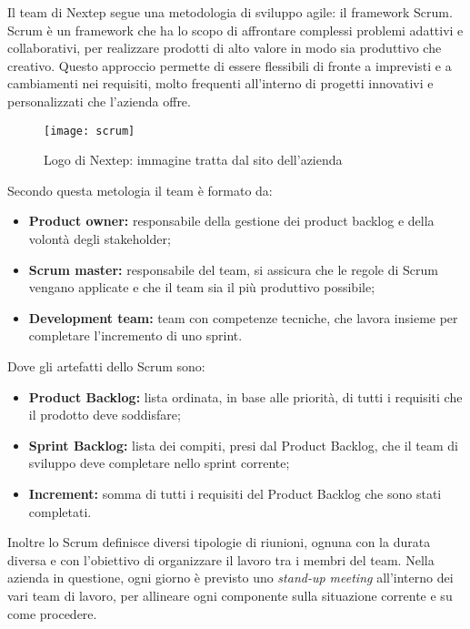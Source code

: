 Il team di Nextep segue una metodologia di sviluppo agile: il \gls{framework} Scrum.
Scrum è un framework che ha lo scopo di affrontare complessi problemi adattivi
e collaborativi, per realizzare prodotti di alto valore in modo sia produttivo che creativo.
Questo approccio permette di essere flessibili di fronte a imprevisti e a cambiamenti
nei requisiti, molto frequenti all’interno di progetti innovativi e personalizzati che
l’azienda offre.
\\
\begin{figure}[!h] 
	\centering 
	\texttt{[image: scrum]} 
	\caption{Logo di Nextep: immagine tratta dal sito dell’azienda}
\end{figure}
\newpage
Secondo questa metologia il team è formato da: 
\begin{itemize}
	\item \textbf{Product owner:} responsabile della gestione dei product backlog e della
	volontà degli stakeholder;
	\item \textbf{Scrum master:} responsabile del team, si assicura che le regole di Scrum
	vengano applicate e che il team sia il più produttivo possibile;
	\item \textbf{Development team:} team con competenze tecniche, che lavora insieme per
	completare l’incremento di uno sprint.
\end{itemize}

Dove gli artefatti dello Scrum sono: 
\begin{itemize}
	\item \textbf{Product Backlog:} lista ordinata, in base alle priorità, di tutti i requisiti che
	il prodotto deve soddisfare;
	\item \textbf{Sprint Backlog:} lista dei compiti, presi dal Product Backlog, che il team di
	sviluppo deve completare nello sprint corrente;
	\item \textbf{Increment:} somma di tutti i requisiti del Product Backlog che sono stati
	completati.
\end{itemize}

Inoltre lo Scrum definisce diversi tipologie di riunioni, ognuna con la durata diversa e con l'obiettivo di organizzare il lavoro tra i membri del team. Nella azienda in questione, ogni giorno è previsto uno \emph{stand-up meeting} all’interno dei vari team di
lavoro, per allineare ogni componente sulla situazione corrente e su come procedere. 


